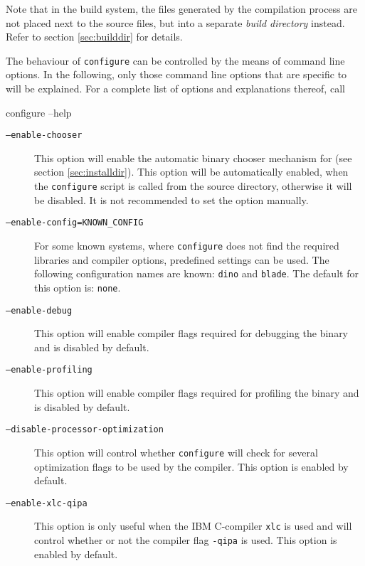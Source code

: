 \noindent Note that in the \es build system, the files generated by
the compilation process are not placed next to the source files, but
into a separate \emph{build directory} instead.  Refer to section
\vref{sec:builddir} for details.

 The behaviour of \texttt{configure} can be
controlled by the means of command line options. In the following,
only those command line options that are specific to \es{} will be
explained.  For a complete list of options and explanations thereof,
call
\begin{code}
configure --help
\end{code}

\begin{description}
\item [\texttt{--enable-chooser}] This option will enable the
  automatic binary chooser mechanism for \es (see section
  \vref{sec:installdir}).  This option will be automatically enabled,
  when the \texttt{configure} script is called from the source
  directory, otherwise it will be disabled. It is not recommended to
  set the option manually.
\item[\texttt{--enable-config=KNOWN\_CONFIG}] For some known systems,
  where \texttt{configure} does not find the required libraries and
  compiler options, predefined settings can be used. The following
  configuration names are known: \texttt{dino} and \texttt{blade}. The
  default for this option is: \texttt{none}.
\item[\texttt{--enable-debug}] This option will enable compiler flags
  required for debugging the \es binary and is disabled by default.
\item[\texttt{--enable-profiling}] This option will enable compiler
  flags required for profiling the \es binary and is disabled by
  default.
\item[\texttt{--disable-processor-optimization}] This option will
  control whether \texttt{configure} will check for several
  optimization flags to be used by the compiler. This option is
  enabled by default.
\item[\texttt{--enable-xlc-qipa}] This option is only useful when the
  IBM C-compiler \texttt{xlc} is used and will control whether or not
  the compiler flag \texttt{-qipa} is used. This option is enabled by
  default.


\end{description}
